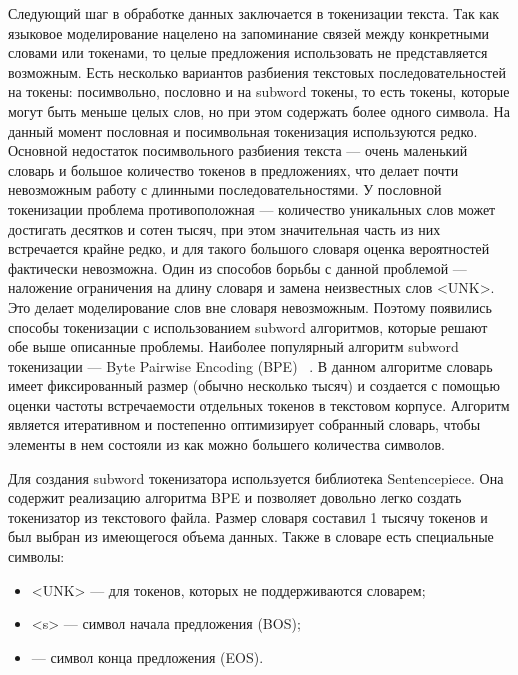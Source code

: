 Следующий шаг в обработке данных заключается в токенизации текста. Так как языковое моделирование нацелено на запоминание связей между конкретными словами или токенами, то целые предложения использовать не представляется возможным. Есть несколько вариантов разбиения текстовых последовательностей на токены: посимвольно, пословно и на subword токены, то есть токены, которые могут быть меньше целых слов, но при этом содержать более одного символа. На данный момент пословная и посимвольная токенизация используются редко. Основной недостаток посимвольного разбиения текста --- очень маленький словарь и большое количество токенов в предложениях, что делает почти невозможным работу с длинными последовательностями. У пословной токенизации проблема противоположная --- количество уникальных слов может достигать десятков и сотен тысяч, при этом значительная часть из них встречается крайне редко, и для такого большого словаря оценка вероятностей фактически невозможна. Один из способов борьбы с данной проблемой --- наложение ограничения на длину словаря и замена неизвестных слов <UNK>. Это делает моделирование слов вне словаря невозможным. Поэтому появились способы токенизации с использованием subword алгоритмов, которые решают обе выше описанные проблемы. Наиболее популярный алгоритм subword токенизации --- Byte Pairwise Encoding (BPE) ~\cite{bpe}. В данном алгоритме словарь имеет фиксированный размер (обычно несколько тысяч) и создается с помощью оценки частоты встречаемости отдельных токенов в текстовом корпусе. Алгоритм является итеративном и постепенно оптимизирует собранный словарь, чтобы элементы в нем состояли из как можно большего количества символов.

Для создания subword токенизатора используется библиотека Sentencepiece. Она содержит реализацию алгоритма BPE и позволяет довольно легко создать токенизатор из текстового файла. Размер словаря составил 1 тысячу токенов и был выбран из имеющегося объема данных. Также в словаре есть специальные символы:

\begin{itemize}
	\item <UNK> --- для токенов, которых не поддерживаются словарем;
	\item <s> --- символ начала предложения (BOS);
	\item {} --- символ конца предложения (EOS).
\end{itemize}

